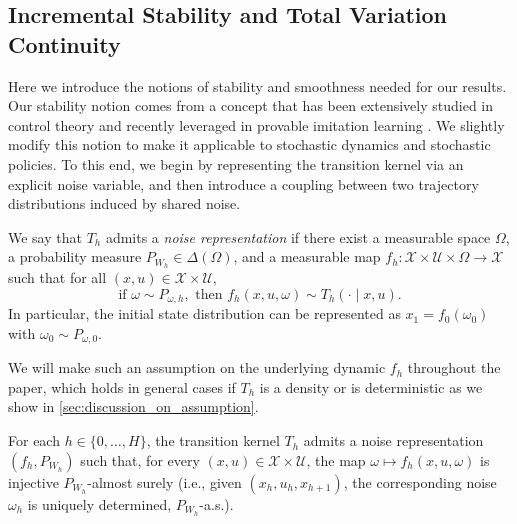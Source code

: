 \documentclass{article}
\begin{document}
\subsection{Incremental Stability and Total Variation Continuity}
Here we introduce the notions of stability and smoothness needed for our results. Our stability notion comes from a concept that has been extensively studied in control theory \citep[e.g.,][]{sontag1989smooth,lohmiller1998contraction,angeli2002lyapunov} and recently leveraged in provable imitation learning \citep[e.g.,][]{pfrommer2022tasil, block2023provable, simchowitz2025pitfalls, zhang2025imitation}. We slightly modify this notion to make it applicable to stochastic dynamics and stochastic policies. To this end, we begin by representing the transition kernel via an explicit noise variable, and then introduce a coupling between two trajectory distributions induced by shared noise.

\begin{definition}
We say that $T_h$ admits a \emph{noise representation} if there exist a measurable space $\Omega$,
a probability measure $P_{W_h}\in\Delta(\Omega)$, and a measurable map
$f_h:\mathcal X\times\mathcal U\times\Omega\to\mathcal X$ such that for all $(x,u)\in\mathcal X\times\mathcal U$,
\begin{equation*}
    \text{if }\omega\sim P_{\omega,h},\text{ then }f_h(x,u,\omega)\sim T_h(\cdot\mid x,u).
\end{equation*}
In particular, the initial state distribution can be represented as $x_1=f_0(\omega_0)$ with
$\omega_0\sim P_{\omega,0}$.
\end{definition}



We will make such an assumption on the underlying dynamic $f_h$ throughout the paper, which holds in general cases if $T_h$ is a density or is deterministic as we show in \cref{sec:discussion_on_assumption}.

\begin{assumption}\label{assum:invertibility}
For each $h\in\{0,\ldots, H\}$, the transition kernel $T_h$ admits a noise representation $(f_h,P_{W_h})$
such that, for every $(x,u)\in\mathcal X\times\mathcal U$, the map
$\omega \mapsto f_h(x,u,\omega)$ is injective $P_{W_h}$-almost surely
(i.e., given $(x_h,u_h,x_{h+1})$, the corresponding noise $\omega_h$ is uniquely determined,
$P_{W_h}$-a.s.).
\end{assumption}
\end{document}
